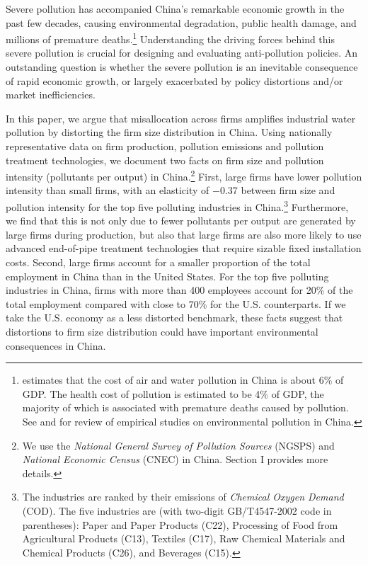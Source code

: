 \documentclass[AEJ]{AEA}
\begin{document}
\maketitle

Severe pollution has accompanied China's remarkable economic growth in the past few decades, causing environmental degradation, public health damage, and millions of premature deaths.\footnote{\citet{WorldBank_Cost_2007} estimates that the cost of air and water pollution in China is about 6\% of GDP. The health cost of pollution is estimated to be 4\% of GDP, the majority of which is associated with premature deaths caused by pollution. See \citet{Vennemoetal:2009} and \citet{ZhengKahn:2013} for review of empirical studies on environmental pollution in China.} Understanding the driving forces behind this severe pollution is crucial for designing and evaluating anti-pollution policies. An outstanding question is whether the severe pollution is an inevitable consequence of rapid economic growth, or largely exacerbated by policy distortions and/or market inefficiencies.

In this paper, we argue that misallocation across firms amplifies industrial water pollution by distorting the firm size distribution in China. Using nationally representative data on firm production, pollution emissions and pollution treatment technologies, we document two facts on firm size and pollution intensity (pollutants per output) in China.\footnote{We use the \textit{National General Survey of Pollution Sources} (NGSPS) and \textit{National Economic Census} (CNEC) in China. Section I provides more details.} First, large firms have lower pollution intensity than small firms, with an elasticity of $-$0.37 between firm size and pollution intensity for the top five polluting industries in China.\footnote{The industries are ranked by their emissions of \textit{Chemical Oxygen Demand} (COD). The five industries are (with two-digit GB/T4547-2002 code in parentheses): Paper and Paper Products (C22), Processing of Food from Agricultural Products (C13), Textiles (C17), Raw Chemical Materials and Chemical Products (C26), and Beverages (C15).} Furthermore, we find that this is not only due to fewer pollutants per output are generated by large firms during production, but also that large firms are also more likely to use advanced end-of-pipe treatment technologies that require sizable fixed installation costs. Second, large firms account for a smaller proportion of the total employment in China than in the United States. For the top five polluting industries in China, firms with more than 400 employees account for 20\% of the total employment compared with close to 70\% for the U.S. counterparts. If we take the U.S. economy as a less distorted benchmark, these facts suggest that distortions to firm size distribution could have important environmental consequences in China.
\end{document}
